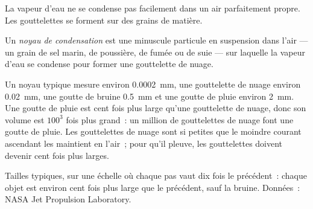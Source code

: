 La vapeur d'eau ne se condense pas facilement dans un air parfaitement
propre. Les gouttelettes se forment sur des grains de matière.

\begin{definition}\label{def:g10:why-clouds-form:nucleus}
Un \emph{noyau de condensation} est une
minuscule particule en suspension dans l'air --- un grain de sel marin, de
poussière, de fumée ou de suie --- sur laquelle la vapeur d'eau se condense
pour former une gouttelette de nuage.
\end{definition}

Un noyau typique mesure environ \qty{0.0002}{mm}, une gouttelette de nuage
environ \qty{0.02}{mm}, une goutte de bruine \qty{0.5}{mm} et une goutte de
pluie environ \qty{2}{mm}. Une goutte de pluie est cent fois plus large
qu'une gouttelette de nuage, donc son volume est $100^3$ fois plus grand~:
un million de gouttelettes de nuage font une goutte de pluie. Les
gouttelettes de nuage sont si petites que le moindre courant ascendant les
maintient en l'air~; pour qu'il pleuve, les gouttelettes doivent devenir
cent fois plus larges.

\begin{omfigure}

{\small Tailles typiques, sur une échelle où chaque pas vaut dix fois le
précédent~: chaque objet est environ cent fois plus large que le précédent,
sauf la bruine. Données~: NASA Jet Propulsion Laboratory.}
\end{omfigure}

